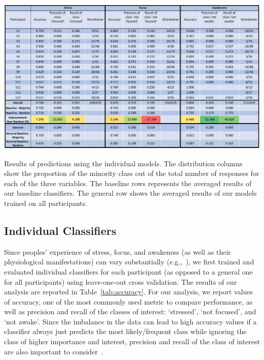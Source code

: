 \begin{table}[h]
  \centering
  \includegraphics[width=1.0\textwidth]{rq1performance_v2.pdf}
  \caption{Results of predictions using the individual models. The distribution columns show the proportion of the minority class out of the total number of responses for each of the three variables. The baseline rows represents the averaged results of our baseline classifiers. The general row shows the averaged results of our models trained on all participants.}\label{tab:accuracy}%
  \vspace*{-4mm}
\end{table}

\subsection{Individual Classifiers}
Since peoples' experience of stress, focus, and awakeness (as well as
their physiological manifestations) can vary substantially
(e.g.,~\cite{Hernandez11}), we first trained and evaluated individual classifiers
for each participant (as opposed to a general one for all
participants) using leave-one-out cross validation. The results of our analysis are reported in
Table~\ref{tab:accuracy}. For our analysis, we report values of
accuracy, one of the most commonly used metric to compare performance,
as well as precision and recall of the classes of interest:
`stressed', `not focused', and `not awake'. Since the imbalance in the
data can lead to high accuracy values if a classifier always just
predicts the most likely/frequent class while ignoring the class of
higher importance and interest, precision and recall of the class of
interest are also important to
consider~\cite{yap2014,bhattacharyya_data_2011,Hernandez11}.

